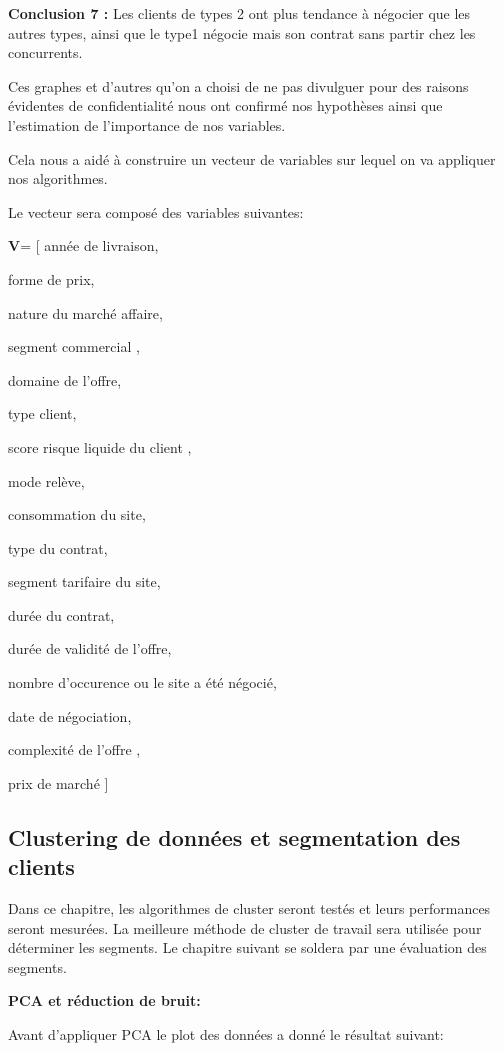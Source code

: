 \documentclass[12pt]{article}
\begin{document}
{%
{\bf Conclusion 7 :} Les clients de types 2 ont plus tendance à négocier que les autres types, ainsi que le type1 négocie mais son contrat sans partir chez les concurrents.

Ces graphes et d’autres qu’on a choisi de ne pas divulguer pour des raisons évidentes de confidentialité nous ont confirmé nos hypothèses ainsi que l’estimation de l’importance de nos variables. 

Cela nous a aidé à construire un vecteur de variables sur lequel on va appliquer nos algorithmes.

Le vecteur sera composé des variables suivantes:

{\bf V}= [	année de livraison,

forme de prix, 

nature du marché affaire, 

segment commercial ,

domaine de l’offre,

type client, 

score risque liquide du client , 

mode relève, 

consommation du  site,

type du contrat,

segment tarifaire du site,

durée du contrat, 

durée de validité de l’offre,

nombre d’occurence ou le site a été négocié,

date de négociation, 

complexité de l’offre ,

prix de marché ]

\subsection{Clustering de données et segmentation des clients } 

Dans ce chapitre, les algorithmes de cluster seront testés et leurs performances seront mesurées. La meilleure méthode de cluster de travail sera utilisée pour déterminer les segments. Le chapitre suivant se soldera par une évaluation des segments.

{\bf PCA et réduction de bruit:}

Avant d’appliquer PCA le plot des données a donné le résultat suivant:

}
\end{document}
